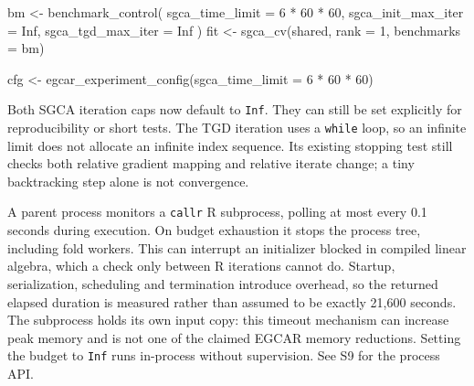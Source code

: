\documentclass[
  11pt,
]{article}
\newenvironment{Shaded}{}{}
\newcommand{\AttributeTok}[1]{\textcolor[rgb]{0.49,0.56,0.16}{#1}}
\newcommand{\ConstantTok}[1]{\textcolor[rgb]{0.53,0.00,0.00}{#1}}
\newcommand{\DecValTok}[1]{\textcolor[rgb]{0.25,0.63,0.44}{#1}}
\newcommand{\FunctionTok}[1]{\textcolor[rgb]{0.02,0.16,0.49}{#1}}
\newcommand{\NormalTok}[1]{#1}
\newcommand{\OtherTok}[1]{\textcolor[rgb]{0.00,0.44,0.13}{#1}}
\newcommand{\SpecialCharTok}[1]{\textcolor[rgb]{0.25,0.44,0.63}{#1}}
\begin{document}
\begin{Shaded}
\begin{Highlighting}[]
\NormalTok{bm }\OtherTok{\textless{}{-}} \FunctionTok{benchmark\_control}\NormalTok{(}
  \AttributeTok{sgca\_time\_limit =} \DecValTok{6} \SpecialCharTok{*} \DecValTok{60} \SpecialCharTok{*} \DecValTok{60}\NormalTok{,}
  \AttributeTok{sgca\_init\_max\_iter =} \ConstantTok{Inf}\NormalTok{,}
  \AttributeTok{sgca\_tgd\_max\_iter =} \ConstantTok{Inf}
\NormalTok{)}
\NormalTok{fit }\OtherTok{\textless{}{-}} \FunctionTok{sgca\_cv}\NormalTok{(shared, }\AttributeTok{rank =} \DecValTok{1}\NormalTok{, }\AttributeTok{benchmarks =}\NormalTok{ bm)}

\NormalTok{cfg }\OtherTok{\textless{}{-}} \FunctionTok{egcar\_experiment\_config}\NormalTok{(}\AttributeTok{sgca\_time\_limit =} \DecValTok{6} \SpecialCharTok{*} \DecValTok{60} \SpecialCharTok{*} \DecValTok{60}\NormalTok{)}
\end{Highlighting}
\end{Shaded}

Both SGCA iteration caps now default to \texttt{Inf}. They can still be
set explicitly for reproducibility or short tests. The TGD iteration
uses a \texttt{while} loop, so an infinite limit does not allocate an
infinite index sequence. Its existing stopping test still checks both
relative gradient mapping and relative iterate change; a tiny
backtracking step alone is not convergence.

A parent process monitors a \texttt{callr} R subprocess, polling at most
every 0.1 seconds during execution. On budget exhaustion it stops the
process tree, including fold workers. This can interrupt an initializer
blocked in compiled linear algebra, which a check only between R
iterations cannot do. Startup, serialization, scheduling and termination
introduce overhead, so the returned elapsed duration is measured rather
than assumed to be exactly 21,600 seconds. The subprocess holds its own
input copy: this timeout mechanism can increase peak memory and is not
one of the claimed EGCAR memory reductions. Setting the budget to
\texttt{Inf} runs in-process without supervision. See S9 for the process
API.
\end{document}
